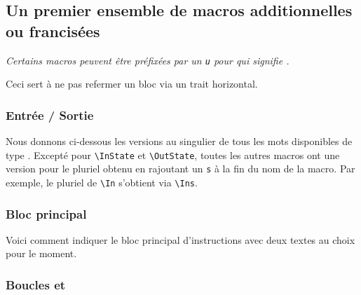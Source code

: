 \documentclass[12pt,a4paper]{article}
\begin{document}

\subsection{Un premier ensemble de macros additionnelles ou francisées}

\begin{frame-gene}
	\centering\itshape
	Certains macros peuvent être préfixées par un \verb+u+ pour  qui signifie .
	
	Ceci sert à ne pas refermer un bloc via un trait horizontal.
\end{frame-gene}





\subsubsection{Entrée / Sortie}

Nous donnons ci-dessous les versions au singulier de tous les mots disponibles de type .
Excepté pour \verb+\InState+ et \verb+\OutState+, toutes les autres macros ont une version pour le pluriel obtenu en rajoutant un \verb+s+ à la fin du nom de la macro.
Par exemple, le pluriel de \verb+\In+ s'obtient via \verb+\Ins+.



\subsubsection{Bloc principal}

Voici comment indiquer le bloc principal d'instructions avec deux textes au choix pour le moment.



\subsubsection{Boucles \TTfor{} et \TTwhile{}}
\end{document}
